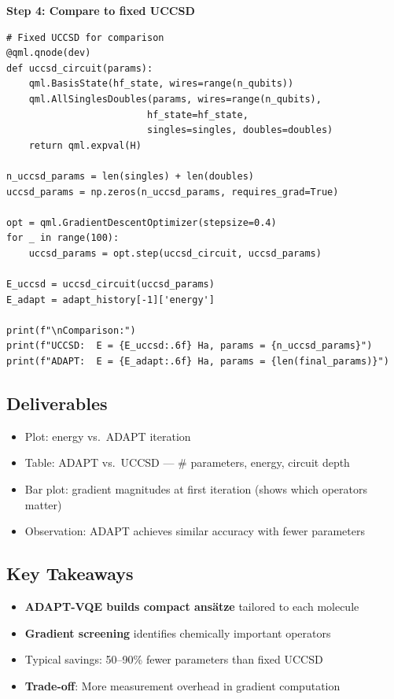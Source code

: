 \documentclass[11pt,a4paper]{article}
\begin{document}
\textbf{Step 4: Compare to fixed UCCSD}
\begin{lstlisting}
# Fixed UCCSD for comparison
@qml.qnode(dev)
def uccsd_circuit(params):
    qml.BasisState(hf_state, wires=range(n_qubits))
    qml.AllSinglesDoubles(params, wires=range(n_qubits),
                         hf_state=hf_state,
                         singles=singles, doubles=doubles)
    return qml.expval(H)

n_uccsd_params = len(singles) + len(doubles)
uccsd_params = np.zeros(n_uccsd_params, requires_grad=True)

opt = qml.GradientDescentOptimizer(stepsize=0.4)
for _ in range(100):
    uccsd_params = opt.step(uccsd_circuit, uccsd_params)

E_uccsd = uccsd_circuit(uccsd_params)
E_adapt = adapt_history[-1]['energy']

print(f"\nComparison:")
print(f"UCCSD:  E = {E_uccsd:.6f} Ha, params = {n_uccsd_params}")
print(f"ADAPT:  E = {E_adapt:.6f} Ha, params = {len(final_params)}")
\end{lstlisting}

\subsection*{Deliverables}
\begin{itemize}
    \item[\checkmark] Plot: energy vs.\ ADAPT iteration
    \item[\checkmark] Table: ADAPT vs.\ UCCSD --- \# parameters, energy, circuit depth
    \item[\checkmark] Bar plot: gradient magnitudes at first iteration (shows which operators matter)
    \item[\checkmark] Observation: ADAPT achieves similar accuracy with fewer parameters
\end{itemize}

\subsection*{Key Takeaways}
\begin{itemize}
    \item \textbf{ADAPT-VQE builds compact ansätze} tailored to each molecule
    \item \textbf{Gradient screening} identifies chemically important operators
    \item Typical savings: 50--90\% fewer parameters than fixed UCCSD
    \item \textbf{Trade-off}: More measurement overhead in gradient computation
\end{itemize}
\end{document}
